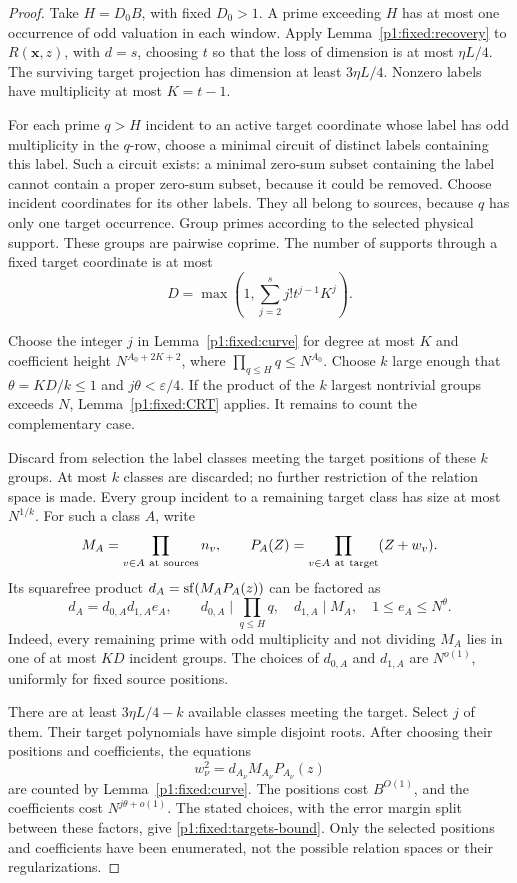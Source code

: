\begin{proof}
Take \(H=D_0B\), with fixed \(D_0>1\). A prime exceeding
\(H\) has at most one occurrence of odd valuation in each
window. Apply Lemma~\ref{p1:fixed:recovery} to
\(R(\boldsymbol x,z)\), with \(d=s\), choosing \(t\) so that
the loss of dimension is at most \(\eta L/4\).
The surviving target projection has dimension at least
\(3\eta L/4\). Nonzero labels have multiplicity at most
\(K=t-1\).

For each prime \(q>H\) incident to an active target coordinate
whose label has odd multiplicity in the \(q\)-row, choose a
minimal circuit of distinct labels containing this label.
Such a circuit exists: a minimal zero-sum subset containing
the label cannot contain a proper zero-sum subset, because
it could be removed. Choose incident coordinates for its
other labels. They all belong to sources, because \(q\)
has only one target occurrence. Group primes according to
the selected physical support. These groups are pairwise
coprime. The number of supports through a fixed target
coordinate is at most
\[
 D=\max\left(1,\sum_{j=2}^{s}j!t^{j-1}K^j\right).
\]

Choose the integer \(j\) in Lemma~\ref{p1:fixed:curve}
for degree at most \(K\) and coefficient height
\(N^{A_0+2K+2}\), where
\(\prod_{q\le H}q\le N^{A_0}\).
Choose \(k\) large enough that
\(\theta=KD/k\le1\) and \(j\theta<\varepsilon/4\).
If the product of the \(k\) largest nontrivial groups
exceeds \(N\), Lemma~\ref{p1:fixed:CRT} applies. It remains
to count the complementary case.

Discard from selection the label classes meeting the target
positions of these \(k\) groups. At most \(k\) classes are
discarded; no further restriction of the relation space is
made. Every group incident to a remaining target class
has size at most \(N^{1/k}\).
For such a class \(A\), write
\[
 M_A=\prod_{v\in A\ {\rm at\ sources}} n_v,\qquad
 P_A(Z)=\prod_{v\in A\ {\rm at\ target}}(Z+w_v).
\]
Its squarefree product \(d_A=\sf(M_AP_A(z))\) can be
factored as
\[
 d_A=d_{0,A}d_{1,A}e_A,\qquad
 d_{0,A}\mid\prod_{q\le H}q,\quad
 d_{1,A}\mid M_A,\quad 1\le e_A\le N^\theta .
\]
Indeed, every remaining prime with odd multiplicity and
not dividing \(M_A\) lies in one of at most \(KD\) incident
groups. The choices of \(d_{0,A}\) and \(d_{1,A}\) are
\(N^{o(1)}\), uniformly for fixed source positions.

There are at least \(3\eta L/4-k\) available classes
meeting the target. Select \(j\) of them. Their target
polynomials have simple disjoint roots. After choosing
their positions and coefficients, the equations
\[
 w_\nu^2=d_{A_\nu}M_{A_\nu}P_{A_\nu}(z)
\]
are counted by Lemma~\ref{p1:fixed:curve}.
The positions cost \(B^{O(1)}\), and the coefficients cost
\(N^{j\theta+o(1)}\). The stated choices, with the error
margin split between these factors, give
\eqref{p1:fixed:targets-bound}.
Only the selected positions and coefficients have been
enumerated, not the possible relation spaces or their
regularizations.
\end{proof}
